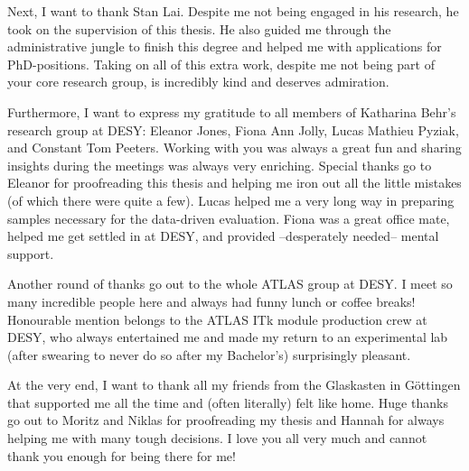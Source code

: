 \documentclass[master,
  oneside,
  BCOR=10mm,
  ngerman,
  english,
  final,%
]{GAUBM}
\begin{document}
Next, I want to thank Stan Lai. Despite me not being engaged in his research, he took on the supervision of this thesis. He also guided me through the administrative jungle to finish this degree and helped me with applications for PhD-positions. Taking on all of this extra work, despite me not being part of your core research group, is incredibly kind and deserves admiration.

Furthermore, I want to express my gratitude to all members of Katharina Behr's research group at DESY: Eleanor Jones, Fiona Ann Jolly, Lucas Mathieu Pyziak, and Constant Tom Peeters. Working with you was always a great fun and sharing insights during the meetings was always very enriching. Special thanks go to Eleanor for proofreading this thesis and helping me iron out all the little mistakes (of which there were quite a few). Lucas helped me a very long way in preparing samples necessary for the data-driven evaluation. Fiona was a great office mate, helped me get settled in at DESY, and provided --desperately needed-- mental support.

Another round of thanks go out to the whole ATLAS group at DESY. I meet so many incredible people here and always had funny lunch or coffee breaks! Honourable mention belongs to the ATLAS ITk module production crew at DESY, who always entertained me and made my return to an experimental lab (after swearing to never do so after my Bachelor's) surprisingly pleasant.

At the very end, I want to thank all my friends from the Glaskasten in Göttingen that supported me all the time and (often literally) felt like home.
Huge thanks go out to Moritz and Niklas for proofreading my thesis and Hannah for always helping me with many tough decisions. I love you all very much and cannot thank you enough for being there for me!



\begin{otherlanguage}{ngerman}
  \Declaration
\end{otherlanguage}
\end{document}

